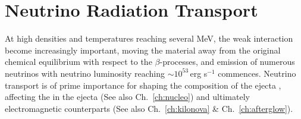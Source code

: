 


\section{Neutrino Radiation Transport}\label{sec:nr_methods:neut}


At high densities and temperatures reaching several MeV, the weak interaction become increasingly important,
moving the material away from the original chemical equilibrium with respect to the 
$\beta$-processes, and emission of numerous neutrinos with neutrino luminosity 
reaching $\sim10^{53}\,$erg s$^{-1}$ commences. 
%
Neutrino transport is of prime importance for shaping the composition of the ejecta
\citep{Wanajo:2014wha,Sekiguchi:2015dma,Foucart:2015vpa,Foucart:2015gaa},
affecting the \nuc{} in the ejecta \citep{Wanajo:2014wha,Goriely:2015fqa} 
(See also Ch.~\ref{ch:nucleo})
and ultimately electromagnetic counterparts \citep{Metzger:2014ila,Lippuner:2015gwa} (See also Ch.~\ref{ch:kilonova} \& Ch.~\ref{ch:afterglow}).


